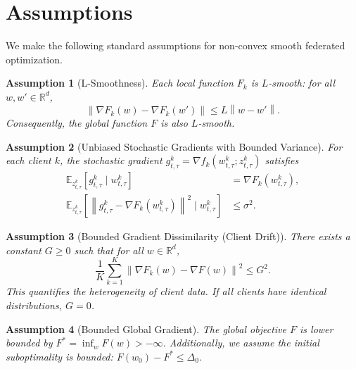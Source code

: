 \documentclass{article}
\newtheorem{assumption}{Assumption}
\newcommand{\norm}[1]{\left\| #1 \right\|}
\begin{document}
\section*{Assumptions}
We make the following standard assumptions for non-convex smooth federated optimization.

\begin{assumption}[L-Smoothness]
Each local function $F_k$ is $L$-smooth: for all $w, w' \in \mathbb{R}^d$,
\begin{equation}
    \norm{\nabla F_k(w) - \nabla F_k(w')} \le L \norm{w - w'}.
\end{equation}
Consequently, the global function $F$ is also $L$-smooth.
\end{assumption}

\begin{assumption}[Unbiased Stochastic Gradients with Bounded Variance]
For each client $k$, the stochastic gradient $g_{t,\tau}^k = \nabla f_k(w_{t,\tau}^k; z_{t,\tau}^k)$ satisfies
\begin{align}
    \mathbb{E}_{z_{t,\tau}^k} \left[ g_{t,\tau}^k \mid w_{t,\tau}^k \right] &= \nabla F_k(w_{t,\tau}^k), \\
    \mathbb{E}_{z_{t,\tau}^k} \left[ \norm{g_{t,\tau}^k - \nabla F_k(w_{t,\tau}^k)}^2 \mid w_{t,\tau}^k \right] &\le \sigma^2.
\end{align}
\end{assumption}

\begin{assumption}[Bounded Gradient Dissimilarity (Client Drift)]
There exists a constant $G \ge 0$ such that for all $w \in \mathbb{R}^d$,
\begin{equation}
    \frac{1}{K} \sum_{k=1}^K \norm{\nabla F_k(w) - \nabla F(w)}^2 \le G^2.
\end{equation}
This quantifies the heterogeneity of client data. If all clients have identical distributions, $G=0$.
\end{assumption}

\begin{assumption}[Bounded Global Gradient]
The global objective $F$ is lower bounded by $F^* = \inf_w F(w) > -\infty$. Additionally, we assume the initial suboptimality is bounded: $F(w_0) - F^* \le \Delta_0$.
\end{assumption}
\end{document}
